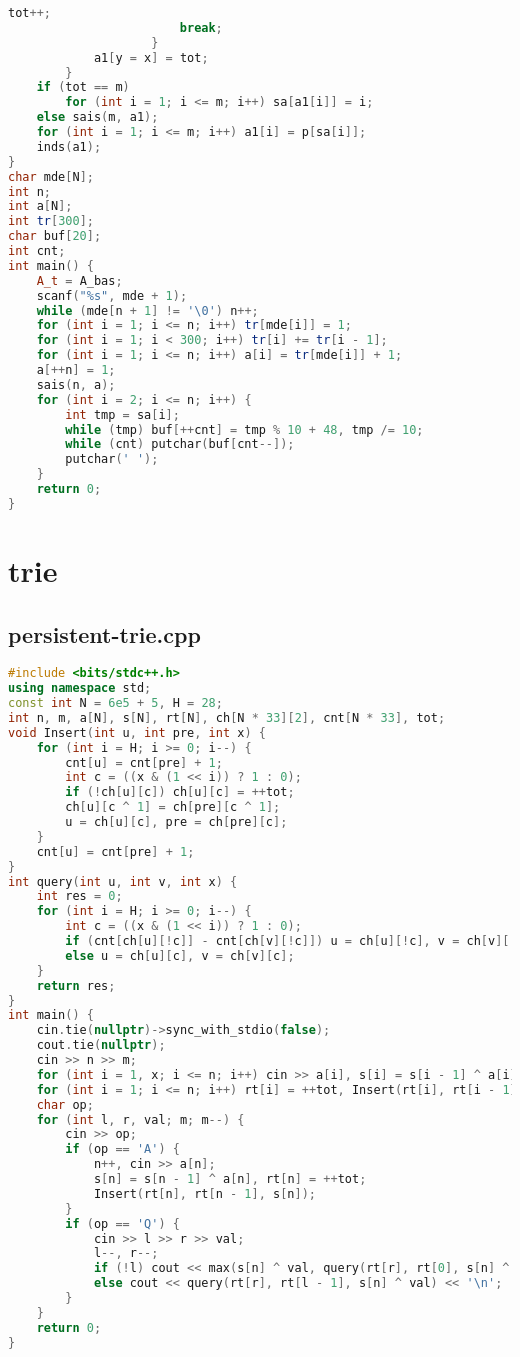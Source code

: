 \documentclass[9pt, a4paper, oneside]{book}
\begin{document}
\begin{lstlisting}[language={C++}]
                        tot++;
                        break;
                    }
            a1[y = x] = tot;
        }
    if (tot == m)
        for (int i = 1; i <= m; i++) sa[a1[i]] = i;
    else sais(m, a1);
    for (int i = 1; i <= m; i++) a1[i] = p[sa[i]];
    inds(a1);
}
char mde[N];
int n;
int a[N];
int tr[300];
char buf[20];
int cnt;
int main() {
    A_t = A_bas;
    scanf("%s", mde + 1);
    while (mde[n + 1] != '\0') n++;
    for (int i = 1; i <= n; i++) tr[mde[i]] = 1;
    for (int i = 1; i < 300; i++) tr[i] += tr[i - 1];
    for (int i = 1; i <= n; i++) a[i] = tr[mde[i]] + 1;
    a[++n] = 1;
    sais(n, a);
    for (int i = 2; i <= n; i++) {
        int tmp = sa[i];
        while (tmp) buf[++cnt] = tmp % 10 + 48, tmp /= 10;
        while (cnt) putchar(buf[cnt--]);
        putchar(' ');
    }
    return 0;
}\end{lstlisting}
\section{trie}
\subsection{persistent-trie.cpp}
\begin{lstlisting}[language={C++}]
#include <bits/stdc++.h>
using namespace std;
const int N = 6e5 + 5, H = 28;
int n, m, a[N], s[N], rt[N], ch[N * 33][2], cnt[N * 33], tot;
void Insert(int u, int pre, int x) {
    for (int i = H; i >= 0; i--) {
        cnt[u] = cnt[pre] + 1;
        int c = ((x & (1 << i)) ? 1 : 0);
        if (!ch[u][c]) ch[u][c] = ++tot;
        ch[u][c ^ 1] = ch[pre][c ^ 1];
        u = ch[u][c], pre = ch[pre][c];
    }
    cnt[u] = cnt[pre] + 1;
}
int query(int u, int v, int x) {
    int res = 0;
    for (int i = H; i >= 0; i--) {
        int c = ((x & (1 << i)) ? 1 : 0);
        if (cnt[ch[u][!c]] - cnt[ch[v][!c]]) u = ch[u][!c], v = ch[v][!c], res += (1 << i);
        else u = ch[u][c], v = ch[v][c];
    }
    return res;
}
int main() {
    cin.tie(nullptr)->sync_with_stdio(false);
    cout.tie(nullptr);
    cin >> n >> m;
    for (int i = 1, x; i <= n; i++) cin >> a[i], s[i] = s[i - 1] ^ a[i];
    for (int i = 1; i <= n; i++) rt[i] = ++tot, Insert(rt[i], rt[i - 1], s[i]);
    char op;
    for (int l, r, val; m; m--) {
        cin >> op;
        if (op == 'A') {
            n++, cin >> a[n];
            s[n] = s[n - 1] ^ a[n], rt[n] = ++tot;
            Insert(rt[n], rt[n - 1], s[n]);
        }
        if (op == 'Q') {
            cin >> l >> r >> val;
            l--, r--;
            if (!l) cout << max(s[n] ^ val, query(rt[r], rt[0], s[n] ^ val)) << '\n';
            else cout << query(rt[r], rt[l - 1], s[n] ^ val) << '\n';
        }
    }
    return 0;
}\end{lstlisting}
\end{document}

